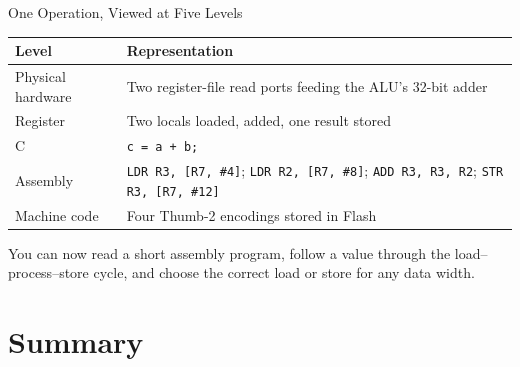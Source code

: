 \documentclass[9pt,aspectratio=169,xcolor=table]{beamer}
\begin{document}
\begin{frame}{One Operation, Viewed at Five Levels}
    \begin{center}
    {\normalsize
    \striped
    \begin{tabular}{@{}l R{.65\textwidth}@{}}
        \toprule
        \textbf{Level} & \textbf{Representation} \\
        \midrule
        Physical hardware & Two register-file read ports feeding the ALU's 32-bit adder \\
        Register          & Two locals loaded, added, one result stored \\
        C                 & \texttt{c = a + b;} \\
        Assembly          & \texttt{LDR R3, [R7, \#4]}; \texttt{LDR R2, [R7, \#8]}; \texttt{ADD R3, R3, R2}; \texttt{STR R3, [R7, \#12]} \\
        Machine code      & Four Thumb-2 encodings stored in Flash \\
        \bottomrule
    \end{tabular}}
    \end{center}

    \vspace{3mm}
    \begin{block}{You can now}
        read a short assembly program, follow a value through the
        load--process--store cycle, and choose the correct load or store
        for any data width.
    \end{block}
\end{frame}


\section{Summary}
\end{document}
